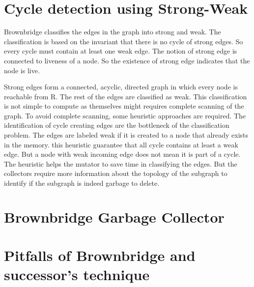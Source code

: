 \section{Cycle detection using Strong-Weak}
Brownbridge classifies the edges in the graph into strong and weak. The classification is based on the invariant that there is no cycle of strong edges. So every cycle must contain at least one weak edge. The notion of strong edge is connected to liveness of a node. So  the existence of strong edge indicates that the node is live. 

Strong edges form a connected, acyclic, directed graph in which every node is reachable from R. The rest of the edges are classified as weak. This classification is not simple to compute as themselves might requires complete scanning of the graph. To avoid complete scanning, some heuristic approaches are required. The identification of cycle creating edges are the bottleneck of the classification problem. The edges are  labeled weak if it is created to a node that already exists in the memory. this heuristic guarantee that all cycle contains at least a weak edge. But a node with weak incoming edge does not mean it is part of a cycle. The heuristic helps the mutator to save time in classifying the edges. But the collectors require more information about the topology of the subgraph to identify if the subgraph is indeed garbage to delete.
\section{Brownbridge Garbage Collector}
\section{Pitfalls of Brownbridge and successor's technique}
